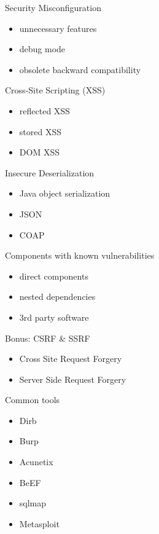 \documentclass{curs}
\begin{document}
\begin{frame}{Security Misconfiguration}
  \begin{itemize}
    \item unnecessary features
    \item debug mode
    \item obsolete backward compatibility
  \end{itemize}
\end{frame}

\begin{frame}{Cross-Site Scripting (XSS)}
  \begin{itemize}
    \item reflected XSS
    \item stored XSS
    \item DOM XSS
  \end{itemize}
\end{frame}

\begin{frame}{Insecure Deserialization}
  \begin{itemize}
    \item Java object serialization
    \item JSON
    \item COAP
  \end{itemize}
\end{frame}

\begin{frame}{Components with known vulnerabilities}
  \begin{itemize}
    \item direct components
    \item nested dependencies
    \item 3rd party software
  \end{itemize}
\end{frame}

\begin{frame}{Bonus: CSRF \& SSRF}
  \begin{itemize}
    \item Cross Site Request Forgery
    \item Server Side Request Forgery
  \end{itemize}
\end{frame}

\begin{frame}{Common tools}
  \begin{itemize}
    \item Dirb
    \item Burp
    \item Acunetix
    \item BeEF
    \item sqlmap
    \item Metasploit
  \end{itemize}
\end{frame}
\end{document}
